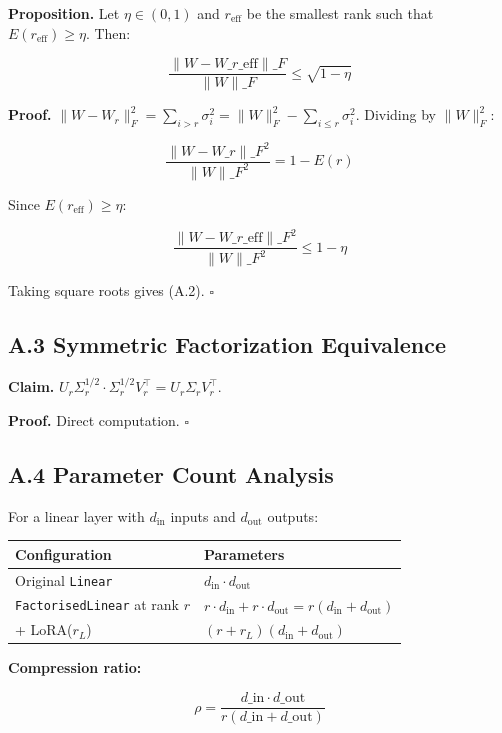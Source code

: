 \textbf{Proposition.} Let $\eta \in (0, 1)$ and $r_\text{eff}$ be the smallest 
rank such that $E(r_\text{eff}) \geq \eta$. Then:

\[
\frac{\|W - W\_{r\_\text{eff}}\|\_F}{\|W\|\_F} \leq \sqrt{1 - \eta}
\tag{A.2}
\]

\textbf{Proof.} $\|W - W_r\|_F^2 = \sum_{i > r} \sigma_i^2 = \|W\|_F^2 - \sum_{i \leq r} \sigma_i^2$. 
Dividing by $\|W\|_F^2$:

\[
\frac{\|W - W\_r\|\_F^2}{\|W\|\_F^2} = 1 - E(r)
\tag{A.3}
\]

Since $E(r_\text{eff}) \geq \eta$:

\[
\frac{\|W - W\_{r\_\text{eff}}\|\_F^2}{\|W\|\_F^2} \leq 1 - \eta
\tag{A.4}
\]

Taking square roots gives (A.2). $\square$

\subsection{A.3 Symmetric Factorization Equivalence}

\textbf{Claim.} $U_r \Sigma_r^{1/2} \cdot \Sigma_r^{1/2} V_r^\top = U_r \Sigma_r V_r^\top$.

\textbf{Proof.} Direct computation. $\square$

\subsection{A.4 Parameter Count Analysis}

For a linear layer with $d_\text{in}$ inputs and $d_\text{out}$ outputs:

\begin{table}[H]
\centering
\small
\begin{tabular}{ll}
\toprule
\textbf{Configuration} & \textbf{Parameters} \\
\midrule
Original \texttt{Linear} & $d_\text{in} \cdot d_\text{out}$ \\
\texttt{FactorisedLinear} at rank $r$ & $r \cdot d_\text{in} + r \cdot d_\text{out} = r(d_\text{in} + d_\text{out})$ \\
+ LoRA($r_L$) & $(r + r_L)(d_\text{in} + d_\text{out})$ \\
\bottomrule
\end{tabular}
\end{table}

\textbf{Compression ratio:}

\[
\rho = \frac{d\_\text{in} \cdot d\_\text{out}}{r(d\_\text{in} + d\_\text{out})}
\tag{A.5}
\]

